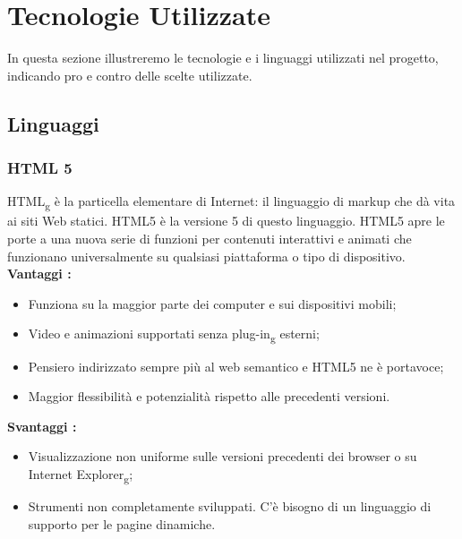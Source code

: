 \section{Tecnologie Utilizzate}{
	In questa sezione illustreremo le tecnologie e i linguaggi utilizzati nel progetto, indicando pro e contro delle scelte utilizzate.
	\subsection{Linguaggi}{
		\subsubsection{HTML 5}{
			HTML\textsubscript{g} è la particella elementare di Internet: il linguaggio di markup che dà vita ai siti Web statici. HTML5 è la versione 5 di questo linguaggio. HTML5 apre le porte a una nuova serie di funzioni per contenuti interattivi e animati che funzionano universalmente su qualsiasi piattaforma o tipo di dispositivo.
			\textbf{Vantaggi :}
			\begin{itemize}\itemsep1pt
				\item Funziona su la maggior parte dei computer e sui dispositivi mobili;
				\item Video e animazioni supportati senza plug-in\textsubscript{g} esterni;
				\item Pensiero indirizzato sempre più al web semantico e HTML5 ne è portavoce;
				\item Maggior flessibilità e potenzialità rispetto alle precedenti versioni.
			\end{itemize}
			\textbf{Svantaggi :}
			\begin{itemize}\itemsep1pt
				\item Visualizzazione non uniforme sulle versioni precedenti dei browser o su Internet Explorer\textsubscript{g};
				\item Strumenti non completamente sviluppati. C'è bisogno di un linguaggio di supporto per le pagine dinamiche.
			\end{itemize}
		}
}}

